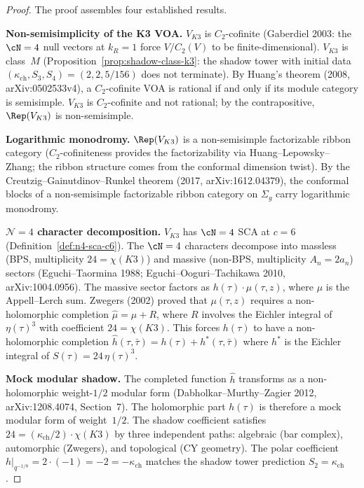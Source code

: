 \begin{proof}
The proof assembles four established results.

\medskip\noindent
\textbf{Non-semisimplicity of the K3 VOA.}
$V_{K3}$ is $C_2$-cofinite (Gaberdiel 2003: the $\cN = 4$ null vectors at $k_R = 1$ force $V/C_2(V)$ to be finite-dimensional).
$V_{K3}$ is class~$M$ (Proposition~\ref{prop:shadow-class-k3}: the shadow tower with initial data $(\kappa_{\mathrm{ch}}, S_3, S_4) = (2, 2, 5/156)$ does not terminate).
By Huang's theorem (2008, arXiv:0502533v4), a $C_2$-cofinite VOA is rational if and only if its module category is semisimple.
$V_{K3}$ is $C_2$-cofinite and not rational; by the contrapositive, $\Rep(V_{K3})$ is non-semisimple.

\medskip\noindent
\textbf{Logarithmic monodromy.}
$\Rep(V_{K3})$ is a non-semisimple factorizable ribbon category ($C_2$-cofiniteness provides the factorizability via Huang--Lepowsky--Zhang; the ribbon structure comes from the conformal dimension twist).
By the Creutzig--Gainutdinov--Runkel theorem (2017, arXiv:1612.04379), the conformal blocks of a non-semisimple factorizable ribbon category on $\Sigma_g$ carry logarithmic monodromy.

\medskip\noindent
\textbf{\texorpdfstring{$\mathcal N=4$}{N=4} character decomposition.}
$V_{K3}$ has $\cN = 4$ SCA at $c = 6$ (Definition~\ref{def:n4-sca-c6}).
The $\cN = 4$ characters decompose into massless (BPS, multiplicity $24 = \chi(K3)$) and massive (non-BPS, multiplicity $A_n = 2a_n$) sectors (Eguchi--Taormina 1988; Eguchi--Ooguri--Tachikawa 2010, arXiv:1004.0956).
The massive sector factors as $h(\tau) \cdot \mu(\tau, z)$, where $\mu$ is the Appell--Lerch sum.
Zwegers (2002) proved that $\mu(\tau, z)$ requires a non-holomorphic completion $\hat\mu = \mu + R$, where $R$ involves the Eichler integral of $\eta(\tau)^3$ with coefficient $24 = \chi(K3)$.
This forces $h(\tau)$ to have a non-holomorphic completion $\hat{h}(\tau, \bar\tau) = h(\tau) + h^*(\tau, \bar\tau)$ where $h^*$ is the Eichler integral of $S(\tau) = 24\,\eta(\tau)^3$.

\medskip\noindent
\textbf{Mock modular shadow.}
The completed function $\hat{h}$ transforms as a non-holomorphic weight-$1/2$ modular form (Dabholkar--Murthy--Zagier 2012, arXiv:1208.4074, Section~7).
The holomorphic part $h(\tau)$ is therefore a mock modular form of weight~$1/2$.
The shadow coefficient satisfies $24 = (\kappa_{\mathrm{ch}}/2) \cdot \chi(K3)$ by three independent paths: algebraic (bar complex), automorphic (Zwegers), and topological (CY geometry).
The polar coefficient $h|_{q^{-1/8}} = 2 \cdot (-1) = -2 = -\kappa_{\mathrm{ch}}$ matches the shadow tower prediction $S_2 = \kappa_{\mathrm{ch}}$.
\end{proof}

